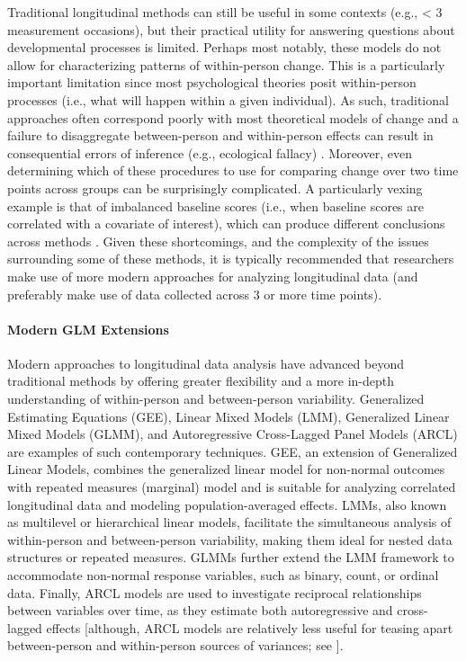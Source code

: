 \documentclass[
  number,
  preprint,
  3p,
  twocolumn]{elsarticle}
\let\oldparagraph\paragraph
\renewcommand{\paragraph}[1]{\oldparagraph{#1}\mbox{}}
\begin{document}
Traditional longitudinal methods can still be useful in some contexts
(e.g., \textless{} 3 measurement occasions), but their practical utility
for answering questions about developmental processes is limited.
Perhaps most notably, these models do not allow for characterizing
patterns of within-person change. This is a particularly important
limitation since most psychological theories posit within-person
processes (i.e., what will happen within a given individual). As such,
traditional approaches often correspond poorly with most theoretical
models of change and a failure to disaggregate between-person and
within-person effects can result in consequential errors of inference
(e.g., ecological fallacy) \citep{curran2011}. Moreover, even
determining which of these procedures to use for comparing change over
two time points across groups can be surprisingly complicated. A
particularly vexing example is that of imbalanced baseline scores (i.e.,
when baseline scores are correlated with a covariate of interest), which
can produce different conclusions across methods \citep[see][for a
review]{littlefield2023}. Given these shortcomings, and the complexity
of the issues surrounding some of these methods, it is typically
recommended that researchers make use of more modern approaches for
analyzing longitudinal data (and preferably make use of data collected
across 3 or more time points).

\hypertarget{modern-glm-extensions}{%
\paragraph{Modern GLM Extensions}\label{modern-glm-extensions}}

Modern approaches to longitudinal data analysis have advanced beyond
traditional methods by offering greater flexibility and a more in-depth
understanding of within-person and between-person variability.
Generalized Estimating Equations (GEE), Linear Mixed Models (LMM),
Generalized Linear Mixed Models (GLMM), and Autoregressive Cross-Lagged
Panel Models (ARCL) are examples of such contemporary techniques. GEE,
an extension of Generalized Linear Models, combines the generalized
linear model for non-normal outcomes with repeated measures (marginal)
model and is suitable for analyzing correlated longitudinal data and
modeling population-averaged effects. LMMs, also known as multilevel or
hierarchical linear models, facilitate the simultaneous analysis of
within-person and between-person variability, making them ideal for
nested data structures or repeated measures. GLMMs further extend the
LMM framework to accommodate non-normal response variables, such as
binary, count, or ordinal data. Finally, ARCL models are used to
investigate reciprocal relationships between variables over time, as
they estimate both autoregressive and cross-lagged effects {[}although,
ARCL models are relatively less useful for teasing apart between-person
and within-person sources of variances; see \citep{curran2021}{]}.
\end{document}
